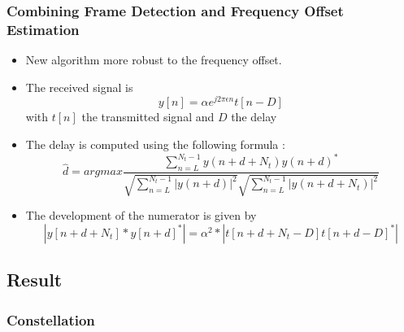 \documentclass[11pt]{beamer}
\begin{document}
\begin{frame}
\frametitle{Combining Frame Detection and Frequency Offset Estimation}
\begin{itemize}
\item New algorithm more robust to the frequency offset.
\item The received signal is 
\begin{equation}
y[n] = \alpha e^{j2\pi \epsilon n}t[n-D]
\end{equation}
with $t[n]$ the transmitted signal and $D$ the delay
\item The delay is computed using the following formula : 
\begin{equation}
\hat{d}=argmax \frac{\sum_{n=L}^{N_t-1} y(n+d+N_t)y(n+d)^*}{\sqrt{\sum_{n=L}^{N_t-1} |y(n+d)|^2}\sqrt{\sum_{n=L}^{N_t-1} |y(n+d+N_t)|^2}}
\end{equation}
\item The development of the numerator is given by
\begin{equation}
|y[n+d+N_t]*y[n+d]^*| = \alpha^2*|t[n+d+N_t-D]t[n+d-D]^*|
\end{equation}
\end{itemize}
\end{frame}

\subsection{Result}
\subsubsection{Constellation}
\end{document}
